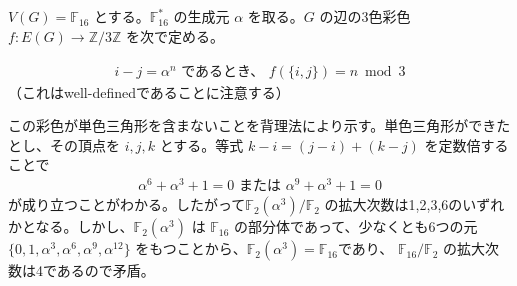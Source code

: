 \subsection{}
$V(G)=\mathbb{F}_{16}$ とする。$\mathbb{F}_{16}^*$ の生成元 $\alpha$ を取る。$G$ の辺の3色彩色 $f:E(G)\to \mathbb{Z}/3\mathbb{Z}$ を次で定める。

\begin{align*}
i-j = \alpha ^ n \text{ であるとき、 } f(\{i,j\}) = n \bmod 3
\end{align*}
（これはwell-definedであることに注意する）

この彩色が単色三角形を含まないことを背理法により示す。単色三角形ができたとし、その頂点を $i,j,k$ とする。等式 $k-i=(j-i)+(k-j)$ を定数倍することで
\begin{align*}
\alpha^6+\alpha^3+1=0 \text{ または } \alpha^9+\alpha^3+1=0
\end{align*}
が成り立つことがわかる。したがって$\mathbb{F}_2(\alpha^3)/\mathbb{F}_{2}$ の拡大次数は1,2,3,6のいずれかとなる。しかし、$\mathbb{F}_2(\alpha^3)$ は $\mathbb{F}_{16}$ の部分体であって、少なくとも6つの元 $\{0,1,\alpha^3,\alpha^6,\alpha^9,\alpha^{12}\}$ をもつことから、$\mathbb{F}_2(\alpha^3)=\mathbb{F}_{16}$であり、 $\mathbb{F}_{16}/\mathbb{F}_{2}$ の拡大次数は4であるので矛盾。
